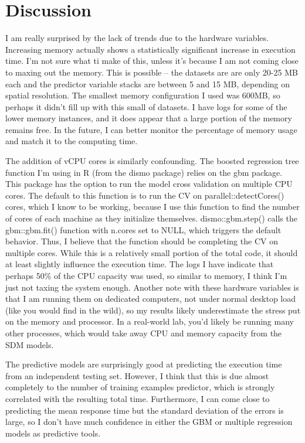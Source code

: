 \documentclass[a4paper]{article}
\begin{document}
\section{Discussion}
I am really surprised by the lack of trends due to the hardware variables.  Increasing memory actually shows a statistically significant increase in execution time.  I'm not sure what ti make of this, unless it's because I am not coming close to maxing out the memory.  This is possible -- the datasets are are only 20-25 MB each and the predictor variable stacks are between 5 and 15 MB, depending on spatial resolution.  The smallest memory configuration I used was 600MB, so perhaps it didn't fill up with this small of datasets. I have logs for some of the lower memory instances, and it does appear that a large portion of the memory remains free. In the future, I can better monitor the percentage of memory usage and match it to the computing time.

The addition of vCPU cores is similarly confounding.  The boosted regression tree function I'm using in R (from the dismo package) relies on the gbm package.  This package has the option to run the model cross validation on multiple CPU cores.  The default to this function is to run the CV on parallel::detectCores() cores, which I know to be working, because I use this function to find the number of cores of each machine as they initialize themselves.  dismo::gbm.step() calls the gbm::gbm.fit() function with n.cores set to NULL, which triggers the default behavior.  Thus, I believe that the function should be completing the CV on multiple cores.  While this is a relatively small portion of the total code, it should at least slightly influence the execution time.  The logs I have indicate that perhaps 50\% of the CPU capacity was used, so similar to memory, I think I'm just not taxing the system enough.  Another note with these hardware variables is that I am running them on dedicated computers, not under normal desktop load (like you would find in the wild), so my results likely underestimate the stress put on the memory and processor.  In a real-world lab, you'd likely be running many other processes, which would take away CPU and memory capacity from the SDM models.

The predictive models are surprisingly good at predicting the execution time from an independent testing set. However, I think that this is due almost completely to the number of training examples predictor, which is strongly correlated with the resulting total time.  Furthermore, I can come close to predicting the mean response time but the standard deviation of the errors is large, so I don't have much confidence in either the GBM or multiple regression models as predictive tools. 
\end{document}
